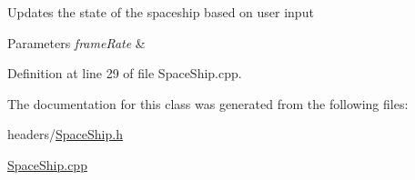 Updates the state of the spaceship based on user input 
\begin{DoxyParams}{Parameters}
{\em frame\+Rate} & \\
\hline
\end{DoxyParams}


Definition at line 29 of file Space\+Ship.\+cpp.



The documentation for this class was generated from the following files\+:\begin{DoxyCompactItemize}
\item 
headers/\mbox{\hyperlink{_space_ship_8h}{Space\+Ship.\+h}}\item 
\mbox{\hyperlink{_space_ship_8cpp}{Space\+Ship.\+cpp}}\end{DoxyCompactItemize}
